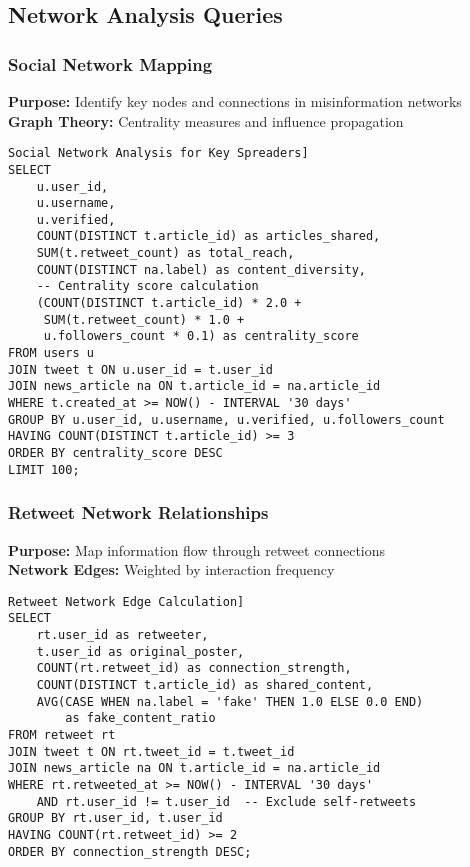 \documentclass[11pt,a4paper]{article}
\begin{document}
\subsection{Network Analysis Queries}

\subsubsection{Social Network Mapping}
\textbf{Purpose:} Identify key nodes and connections in misinformation networks\\
\textbf{Graph Theory:} Centrality measures and influence propagation

\begin{verbatim}Social Network Analysis for Key Spreaders]
SELECT 
    u.user_id,
    u.username,
    u.verified,
    COUNT(DISTINCT t.article_id) as articles_shared,
    SUM(t.retweet_count) as total_reach,
    COUNT(DISTINCT na.label) as content_diversity,
    -- Centrality score calculation
    (COUNT(DISTINCT t.article_id) * 2.0 + 
     SUM(t.retweet_count) * 1.0 + 
     u.followers_count * 0.1) as centrality_score
FROM users u
JOIN tweet t ON u.user_id = t.user_id
JOIN news_article na ON t.article_id = na.article_id
WHERE t.created_at >= NOW() - INTERVAL '30 days'
GROUP BY u.user_id, u.username, u.verified, u.followers_count
HAVING COUNT(DISTINCT t.article_id) >= 3
ORDER BY centrality_score DESC
LIMIT 100;
\end{verbatim}

\subsubsection{Retweet Network Relationships}
\textbf{Purpose:} Map information flow through retweet connections\\
\textbf{Network Edges:} Weighted by interaction frequency

\begin{verbatim}Retweet Network Edge Calculation]
SELECT 
    rt.user_id as retweeter,
    t.user_id as original_poster,
    COUNT(rt.retweet_id) as connection_strength,
    COUNT(DISTINCT t.article_id) as shared_content,
    AVG(CASE WHEN na.label = 'fake' THEN 1.0 ELSE 0.0 END) 
        as fake_content_ratio
FROM retweet rt
JOIN tweet t ON rt.tweet_id = t.tweet_id
JOIN news_article na ON t.article_id = na.article_id
WHERE rt.retweeted_at >= NOW() - INTERVAL '30 days'
    AND rt.user_id != t.user_id  -- Exclude self-retweets
GROUP BY rt.user_id, t.user_id
HAVING COUNT(rt.retweet_id) >= 2
ORDER BY connection_strength DESC;
\end{verbatim}
\end{document}
